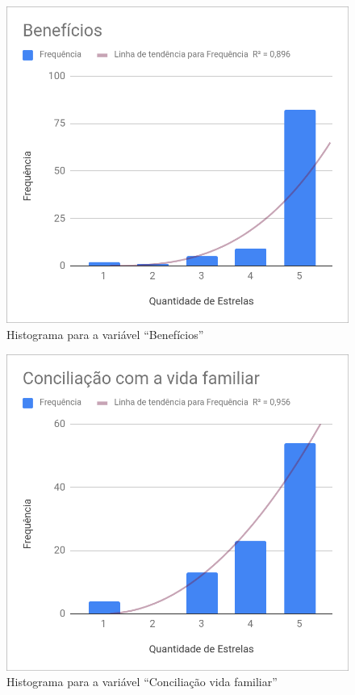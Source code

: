 	\begin{figure}[H]
		\centering
		\caption{Histograma para a variável ``Benefícios''}
		\label{fig:beneficios}
		\includegraphics[width=1\linewidth]{img/beneficios}
	\end{figure}
		
	\begin{figure}[H]
		\centering
		\caption{Histograma para a variável ``Conciliação vida familiar''}
		\label{fig:familiar}
		\includegraphics[width=1\linewidth]{img/conc_vida_familiar}
	\end{figure}
	

